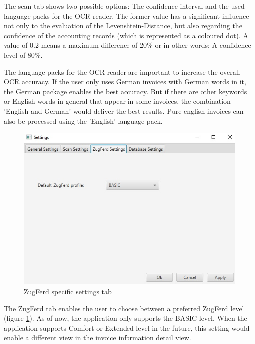 The scan tab shows two possible options: The confidence interval and the used language packs for the OCR reader. The former value has a significant influence not only to the evaluation of the Levenshtein-Distance, but also regarding the confidence of the accounting records (which is represented as a coloured dot). A value of 0.2 means a maximum difference of 20\% or in other words: A confidence level of 80\%.

The language packs for the OCR reader are important to increase the overall OCR accuracy. If the user only uses German invoices with German words in it, the German package enables the best accuracy. But if there are other keywords or English words in general that appear in some invoices, the combination 'English and German' would deliver the best results. Pure english invoices can also be processed using the 'English' language pack.

\begin{figure}[ht!]
\centering
\includegraphics[width=\textwidth]{Images/GUI/settings_ZugFerd.jpg}
\caption{ZugFerd specific settings tab \label{settings_ZugFerd}}
\end{figure}

The ZugFerd tab enables the user to choose between a preferred ZugFerd level (figure \ref{settings_ZugFerd}). As of now, the application only supports the BASIC level. When the application supports Comfort or Extended level in the future, this setting would enable a different view in the invoice information detail view.


